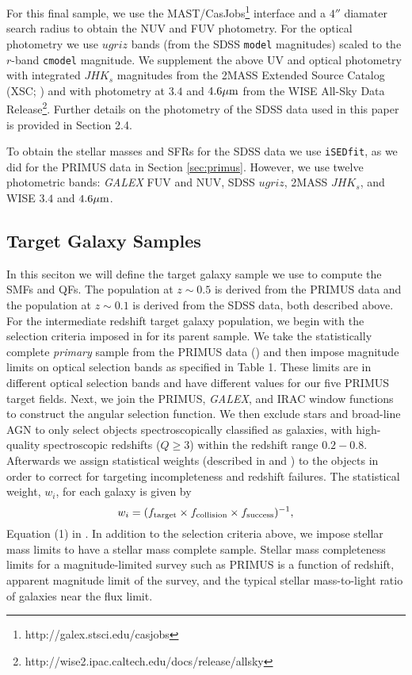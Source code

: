 \documentclass{emulateapj}
\begin{document}
For this final sample, we use the MAST/CasJobs\footnote{http://galex.stsci.edu/casjobs} interface and a $4''$ diamater search radius to obtain the NUV and FUV photometry. 
For the optical photometry we use $ugriz$ bands (from the SDSS \texttt{model} magnitudes) scaled to the $r$-band \texttt{cmodel} magnitude. 
We supplement the above UV and optical photometry with integrated $JHK_s$ magnitudes from the 2MASS Extended Source Catalog (XSC; \cite{Jarrett:2000aa}) and with photometry at $3.4$ 
and $4.6 \mu \rm{m}$ from the WISE All-Sky Data Release\footnote{http://wise2.ipac.caltech.edu/docs/release/allsky}. 
Further details on the photometry of the SDSS data used in this paper is provided in \cite{Moustakas:2013aa} Section 2.4. 

To obtain the stellar masses and SFRs for the SDSS data we use \texttt{iSEDfit}, as we did for the PRIMUS data in Section \ref{sec:primus}.  
However, we use twelve photometric bands: {\em GALEX} FUV and NUV, SDSS $ugriz$, 2MASS $JHK_{s}$, and WISE $3.4$ and $4.6 \mu \rm{m}$.

\subsection{Target Galaxy Samples} \label{sec:target} 
In this seciton we will define the target galaxy sample we use to compute the SMFs and QFs.
The population at $z \sim 0.5$ is derived from the PRIMUS data and the population at $z \sim 0.1$ is derived from the SDSS data, both described above.
For the intermediate redshift target galaxy population, we begin with the selection criteria imposed in \cite{Moustakas:2013aa} for its parent sample.
We take the statistically complete {\em primary} sample from the PRIMUS data (\cite{Coil:2011aa}) and then impose magnitude limits on optical selection bands as specified in 
\cite{Moustakas:2013aa} Table 1.
These limits are in different optical selection bands and have different values for our five PRIMUS target fields.
Next, we join the PRIMUS, {\em GALEX}, and IRAC window functions to construct the angular selection function.
We then exclude stars and broad-line AGN to only select objects spectroscopically classified as galaxies, with high-quality spectroscopic redshifts ($Q \geq 3$) within the 
redshift range $0.2 - 0.8$.
Afterwards we assign statistical weights (described in \cite{Coil:2011aa} and \cite{Cool:2013aa}) to the objects in order to correct for targeting incompleteness and redshift failures.
The statistical weight, $w_i$, for each galaxy is given by
\begin{equation}
w_{i} = (f_{\rm{target}} \times f_{\rm{collision}} \times f_{\rm{success}})^{-1},
\end{equation}
Equation (1) in \cite{Moustakas:2013aa}.
In addition to the selection criteria above, we impose stellar mass limits to have a stellar mass complete sample.  
Stellar mass completeness limits for a magnitude-limited survey such as PRIMUS is a function of redshift, apparent magnitude limit of the survey, and the typical stellar 
mass-to-light ratio of galaxies near the flux limit.
\end{document}
